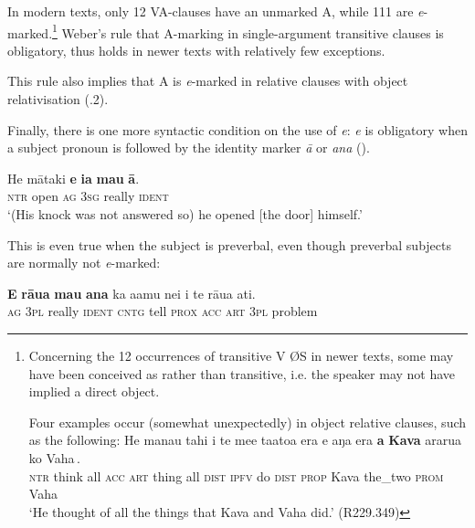 In modern texts, only 12 VA-clauses have an unmarked A, while 111 are \textit{e}{}-marked.\footnote{\label{fn:392}Concerning the 12 occurrences of transitive V ØS in newer texts, some may have been conceived as  rather than transitive, i.e. the speaker may not have implied a direct object. 

Four examples occur (somewhat unexpectedly) in object relative clauses, such as the following:
\ea
\gll
He mana{\ꞌ}u tahi i te me{\ꞌ}e ta{\ꞌ}ato{\ꞌ}a era {\ob}e aŋa era \textbf{a} \textbf{Kava} ararua ko Vaha\,{\cb}.\\
  \textsc{ntr} think all \textsc{acc} \textsc{art} thing all \textsc{dist} {\db}\textsc{ipfv} do \textsc{dist} \textsc{prop} Kava the\_two \textsc{prom} Vaha\\
  \glt 
  ‘He thought of all the things that Kava and Vaha did.’ (R229.349)
  \z} Weber’s rule that A-marking in single-argument transitive clauses is obligatory, thus holds in newer texts with relatively few exceptions.

This rule also implies that A is \textit{e}{}-marked in relative clauses with object relativisation (.2).

Finally, there is one more syntactic condition on the use of \textit{e}: \textit{e} is obligatory when a subject pronoun is followed by the identity marker \textit{{\ꞌ}ā} or \textit{{\ꞌ}ana} (). 

\ea\label{ex:8.13}
\gll He mātaki \textbf{e} \textbf{ia} \textbf{mau} \textbf{{\ꞌ}ā}. \\
\textsc{ntr} open \textsc{ag} \textsc{3sg} really \textsc{ident} \\

\glt
‘(His knock was not answered so) he opened [the door] himself.’ \textstyleExampleref{[R399.189]} 
\z

This is even true when the subject is preverbal, even though preverbal subjects are normally not \textit{e}{}-marked:

\ea\label{ex:8.14}
\gll \textbf{E} \textbf{rāua} \textbf{mau} \textbf{{\ꞌ}ana} ka {\ꞌ}a{\ꞌ}amu nei i te rāua {\ꞌ}ati. \\
\textsc{ag} \textsc{3pl} really \textsc{ident} \textsc{cntg} tell \textsc{prox} \textsc{acc} \textsc{art} \textsc{3pl} problem \\

